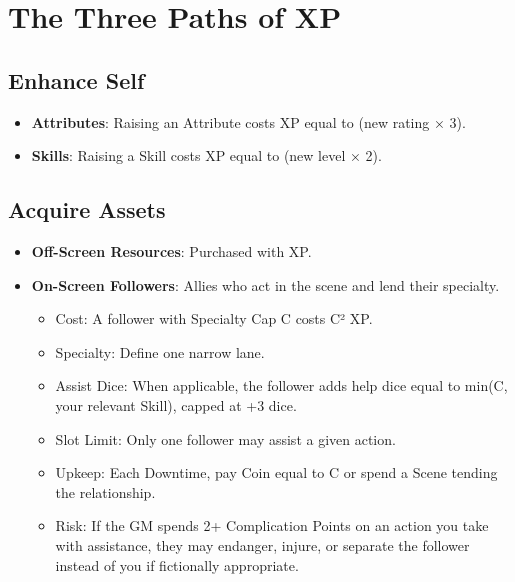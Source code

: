 \documentclass[11pt]{article}
\begin{document}
\section{The Three Paths of XP}

\subsection{Enhance Self}
\begin{itemize}
    \item \textbf{Attributes}: Raising an Attribute costs XP equal to (new rating × 3).
    \item \textbf{Skills}: Raising a Skill costs XP equal to (new level × 2).
\end{itemize}

\subsection{Acquire Assets}
\begin{itemize}
    \item \textbf{Off-Screen Resources}: Purchased with XP.
    \item \textbf{On-Screen Followers}: Allies who act in the scene and lend their specialty.
    \begin{itemize}
        \item Cost: A follower with Specialty Cap C costs C² XP.
        \item Specialty: Define one narrow lane.
        \item Assist Dice: When applicable, the follower adds help dice equal to min(C, your relevant Skill), capped at +3 dice.
        \item Slot Limit: Only one follower may assist a given action.
        \item Upkeep: Each Downtime, pay Coin equal to C or spend a Scene tending the relationship.
        \item Risk: If the GM spends 2+ Complication Points on an action you take with assistance, they may endanger, injure, or separate the follower instead of you if fictionally appropriate.
    \end{itemize}
\end{itemize}
\end{document}
